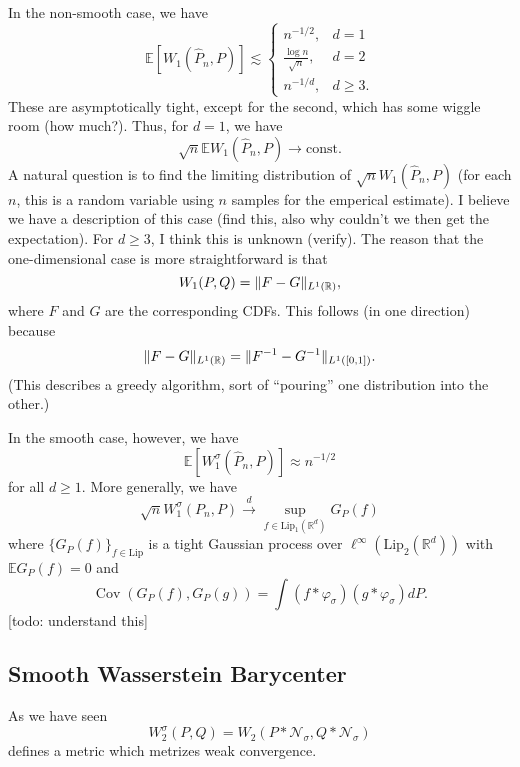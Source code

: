 \documentclass{article}
\newcommand{\R}{\mathbb{R}}
\newcommand{\E}{\mathbb{E}}
\newcommand{\Lip}{\mathrm{Lip}}
\newcommand{\N}{\mathcal{N}}
\DeclareMathOperator{\Cov}{Cov}
\DeclarePairedDelimiter{\norm}{\lVert}{\rVert}
\begin{document}
In the non-smooth case, we have
\begin{equation*}
    \E[W_1(\hat{P}_n, P)] \lesssim \begin{cases}
        n^{-1/2}, &d=1\\
        \frac{\log n}{\sqrt{n}}, &d=2\\
        n^{-1/d}, &d \geq 3.
    \end{cases}
\end{equation*}
These are asymptotically tight, except for the second, which has some wiggle room (how much?). Thus, for $d=1$, we have
\begin{equation*}
    \sqrt{n} \E W_1(\hat{P}_n,P) \to \text{const}.
\end{equation*}
A natural question is to find the limiting distribution of $\sqrt{n} W_1(\hat{P}_n, P)$ (for each $n$, this is a random variable using $n$ samples for the emperical estimate). I believe we have a description of this case (find this, also why couldn't we then get the expectation). For $d \geq 3$, I think this is unknown (verify). The reason that the one-dimensional case is more straightforward is that
\begin{equation*}
    W_1(P,Q) = \norm{F - G}_{L^1(\R)},
\end{equation*}
where $F$ and $G$ are the corresponding CDFs. This follows (in one direction) because
\begin{equation*}
    \norm{F - G}_{L^1(\R)} = \norm{F^{-1} - G^{-1}}_{L^1([0,1])}.
\end{equation*}
(This describes a greedy algorithm, sort of ``pouring'' one distribution into the other.)

In the smooth case, however, we have
\begin{equation*}
    \E[W_1^\sigma(\hat{P}_n,P)] \approx n^{-1/2}
\end{equation*}
for all $d \geq 1$. More generally, we have
\begin{equation*}
    \sqrt{n} W_1^\sigma(P_n,P) \xrightarrow{d} \sup_{f \in \Lip_1(\R^d)} G_P(f)
\end{equation*}
where $\{G_P(f)\}_{f \in \Lip}$ is a tight Gaussian process over $\ell^\infty(\Lip_2(\R^d))$ with $\E G_P(f) = 0$
and
\begin{equation*}
    \Cov(G_P(f), G_P(g)) = \int (f * \varphi_\sigma) (g * \varphi_\sigma) dP.
\end{equation*}
[todo: understand this]

\subsection{Smooth Wasserstein Barycenter}
As we have seen
\begin{equation*}
    W_2^\sigma(P,Q) = W_2(P*\N_\sigma,Q*\N_\sigma)
\end{equation*}
defines a metric which metrizes weak convergence.
\end{document}
